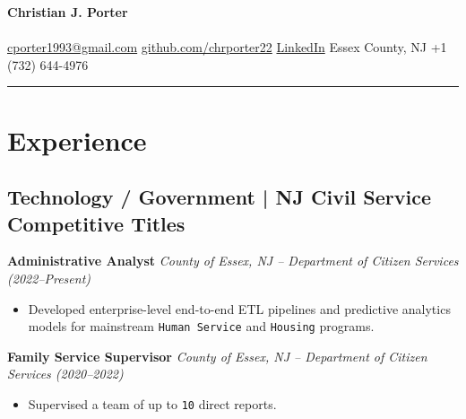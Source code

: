 \documentclass[11pt,a4paper]{article}
\newcommand{\name}{\textbf{\Large Christian J. Porter}}
\begin{document}
\pagestyle{empty}

\begin{center}
  {\small \name} \\[-0.2em]
  {\titletext} \\[-0.1em]
  {\href{mailto:cporter1993@gmail.com}{cporter1993@gmail.com} \quad
  \href{https://github.com/chrporter22}{github.com/chrporter22} \quad
  \href{https://www.linkedin.com/in/christian-j-porter/}{LinkedIn} \quad
  Essex County, NJ \quad
  +1 (732) 644-4976}
\end{center}

\vspace{0.5mm}
\hrule
\vspace{0.5mm}

\section*{Experience}

\subsection*{Technology / Government | NJ Civil Service Competitive Titles}

\par\noindent\textbf{Administrative Analyst}  
\newline\textit{County of Essex, NJ – Department of Citizen Services (2022–Present)}  
\begin{itemize}
  \item Developed enterprise-level end-to-end ETL pipelines and predictive analytics models for mainstream \texttt{Human Service} and \texttt{Housing} programs.
\end{itemize}

\par\noindent\textbf{Family Service Supervisor}  
\newline\textit{County of Essex, NJ – Department of Citizen Services (2020–2022)}  
\begin{itemize}
  \item Supervised a team of up to \texttt{10} direct reports.
\end{itemize}
\end{document}
